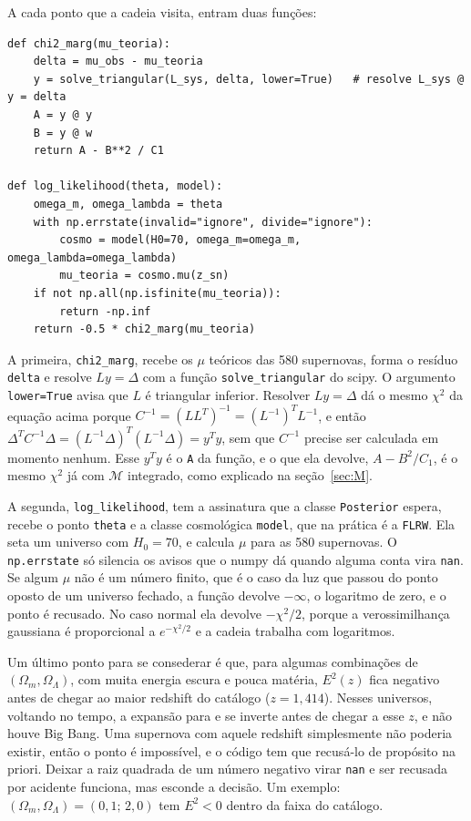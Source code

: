 \documentclass[11pt,a4paper]{article}
\newcommand{\Om}{\Omega_m}
\newcommand{\OL}{\Omega_\Lambda}
\newcommand{\M}{\mathcal{M}}
\begin{document}
A cada ponto que a cadeia visita, entram duas funções:
\begin{lstlisting}
def chi2_marg(mu_teoria):
    delta = mu_obs - mu_teoria
    y = solve_triangular(L_sys, delta, lower=True)   # resolve L_sys @ y = delta
    A = y @ y
    B = y @ w
    return A - B**2 / C1

def log_likelihood(theta, model):
    omega_m, omega_lambda = theta
    with np.errstate(invalid="ignore", divide="ignore"):
        cosmo = model(H0=70, omega_m=omega_m, omega_lambda=omega_lambda)
        mu_teoria = cosmo.mu(z_sn)
    if not np.all(np.isfinite(mu_teoria)):
        return -np.inf
    return -0.5 * chi2_marg(mu_teoria)
\end{lstlisting}

A primeira, \texttt{chi2\_marg}, recebe os $\mu$ teóricos das 580 supernovas,
forma o resíduo \texttt{delta} e resolve $Ly = \Delta$ com a função
\texttt{solve\_triangular} do scipy. O argumento \texttt{lower=True} avisa que
$L$ é triangular inferior. Resolver $Ly = \Delta$ dá o
mesmo $\chi^2$ da equação acima porque
$C^{-1} = (LL^T)^{-1} = (L^{-1})^T L^{-1}$, e então
$\Delta^T C^{-1} \Delta = (L^{-1}\Delta)^T (L^{-1}\Delta) = y^Ty$, sem que
$C^{-1}$ precise ser calculada em momento nenhum. Esse $y^Ty$ é o \texttt{A} da
função, e o que ela devolve, $A - B^2/C_1$, é o mesmo $\chi^2$ já com $\M$
integrado, como explicado na seção~\ref{sec:M}.

A segunda, \texttt{log\_likelihood}, tem a assinatura que a classe
\texttt{Posterior} espera, recebe o ponto \texttt{theta} e a classe cosmológica
\texttt{model}, que na prática é a \texttt{FLRW}. Ela seta um universo com
$H_0 = 70$, e
calcula $\mu$ para as 580 supernovas. O \texttt{np.errstate} só silencia os avisos que o numpy dá quando alguma
conta vira \texttt{nan}. Se algum $\mu$ não é um número finito, que é o caso da
luz que passou do ponto oposto de um universo fechado, a função devolve
$-\infty$, o logaritmo de zero, e o ponto é recusado. No caso normal ela devolve
$-\chi^2/2$, porque a verossimilhança gaussiana é proporcional a
$e^{-\chi^2/2}$ e a cadeia trabalha com logaritmos.



Um último ponto para se consederar é que, para algumas combinações de $(\Om,\OL)$, com muita energia escura e pouca
matéria, $E^2(z)$ fica negativo antes de chegar ao maior redshift do catálogo
($z = 1{,}414$). Nesses universos, voltando no tempo, a expansão para e se
inverte antes de chegar a esse $z$, e não houve Big Bang. Uma supernova com
aquele redshift simplesmente não poderia existir, então o ponto é impossível,
e o código tem que recusá-lo de propósito na priori. Deixar a raiz quadrada de
um número negativo virar \texttt{nan} e ser recusada por acidente funciona, mas
esconde a decisão. Um exemplo: $(\Om,\OL) = (0{,}1;\,2{,}0)$ tem $E^2 < 0$ dentro
da faixa do catálogo.
\end{document}
